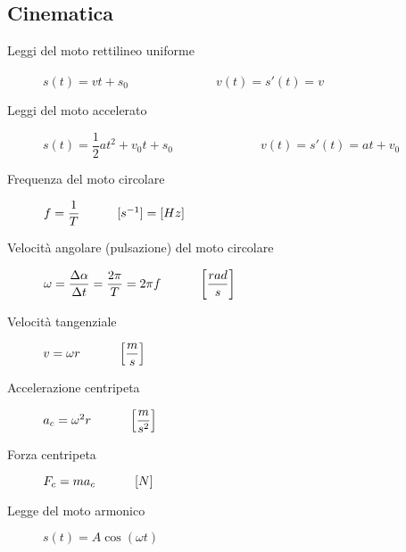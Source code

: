 \documentclass[a4paper,11pt,italian]{article}
\begin{document}
\subsection{Cinematica}\label{sec:cinematica}
\begin{description}
  \item[Leggi del moto rettilineo uniforme] 
  $ s(t) = v  t + s_0 $~~~~~~~~~~~~~~$ v(t) = s'(t) = v $

  \item[Leggi del moto accelerato] 
  $ s(t) = \dfrac{1}{2} a t^2 + v_0 t + s_0 $~~~~~~~~~~~~~~$ v(t) = s'(t) = at + v_0 $
  
  \item[Frequenza del moto circolare] 
  $ f = \dfrac{1}{T} \hspace*{3em} [s^{-1}]=[ Hz] $

  \item[Velocità angolare (pulsazione) del moto circolare] 
  $ \omega = \dfrac{\Delta\alpha}{\Delta t} = \dfrac{2 \pi}{T} = 2 \pi f \hspace*{3em} \left[ \dfrac{rad}{s} \right] $
  
  \item[Velocità tangenziale] 
  $ v = \omega r  \hspace*{3em} \left[ \dfrac{m}{s} \right]$
  
  \item[Accelerazione centripeta] 
  $ a_c = \omega^2 r \hspace*{3em} \left[ \dfrac{m}{s^2} \right] $
  
  \item[Forza centripeta] 
  $ F_c = m  a_c \hspace*{3em} \left[ N \right] $
  
  \item[Legge del moto armonico]  $ s(t) = A \cos(\omega t) $
\end{description}
\end{document}
